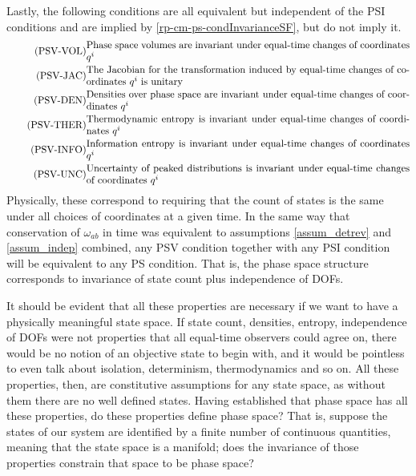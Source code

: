 Lastly, the following conditions are all equivalent but independent of the PSI conditions and are implied by \ref{rp-cm-ps-condInvarianceSF}, but do not imply it.
\begin{align}
	\tag{PSV-VOL}\label{rp-cm-ps-condInvariantVolume}
	&\eqtext{Phase space volumes are invariant under equal-time changes of coordinates $q^i$} \\
	\tag{PSV-JAC}\label{rp-cm-ps-condUnitaryJacobian}
	&\eqtext{The Jacobian for the transformation induced by equal-time changes of coordinates $q^i$ is unitary} \\
	\tag{PSV-DEN}\label{rp-cm-ps-condConservedDensities}
	&\eqtext{Densities over phase space are invariant under equal-time changes of coordinates $q^i$} \\
	\tag{PSV-THER}\label{rp-cm-ps-condInvariantEntropy}
	&\eqtext{Thermodynamic entropy is invariant under equal-time changes of coordinates $q^i$} \\
	\tag{PSV-INFO}\label{rp-cm-ps-condInvariantInformation}
	&\eqtext{Information entropy is invariant under equal-time changes of coordinates $q^i$} \\
	\tag{PSV-UNC}\label{rp-cm-ps-condInvariantUncertainty}
	&\eqtext{Uncertainty of peaked distributions is invariant under equal-time changes of coordinates $q^i$}
\end{align}
Physically, these correspond to requiring that the count of states is the same under all choices of coordinates at a given time. In the same way that conservation of $\omega_{ab}$ in time was equivalent to assumptions \ref{assum_detrev} and \ref{assum_indep} combined, any PSV condition together with any PSI condition will be equivalent to any PS condition. That is, the phase space structure corresponds to invariance of state count plus independence of DOFs.

It should be evident that all these properties are necessary if we want to have a physically meaningful state space. If state count, densities, entropy, independence of DOFs were not properties that all equal-time observers could agree on, there would be no notion of an objective state to begin with, and it would be pointless to even talk about isolation, determinism, thermodynamics and so on. All these properties, then, are constitutive assumptions for any state space, as without them there are no well defined states. Having established that phase space has all these properties, do these properties define phase space? That is, suppose the states of our system are identified by a finite number of continuous quantities, meaning that the state space is a manifold; does the invariance of those properties constrain that space to be phase space?


